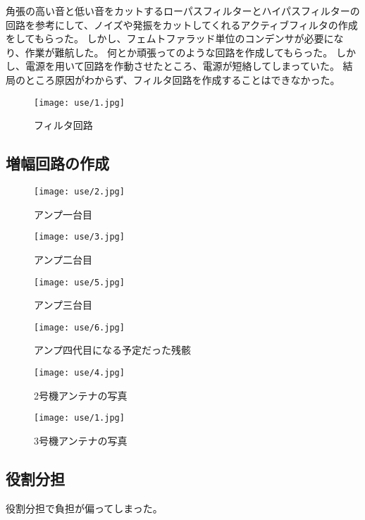 \documentclass[report.tex]{subfiles}
\begin{document}
角張の高い音と低い音をカットするローパスフィルターとハイパスフィルターの回路を参考にして、ノイズや発振をカットしてくれるアクティブフィルタの作成をしてもらった。
しかし、フェムトファラッド単位のコンデンサが必要になり、作業が難航した。
何とか頑張ってのような回路を作成してもらった。
しかし、電源を用いて回路を作動させたところ、電源が短絡してしまっていた。
結局のところ原因がわからず、フィルタ回路を作成することはできなかった。

\begin{figure}[H]
	\centering
	\texttt{[image: use/1.jpg]}
	\caption{フィルタ回路}
	\label{fig:filter}
\end{figure}

\subsection{増幅回路の作成}

\begin{figure}[H]
	\begin{minipage}[b]{0.5\linewidth}
		\centering
		\texttt{[image: use/2.jpg]}
		\caption{アンプ一台目}
		\label{fig:s_2}
	\end{minipage}
	\begin{minipage}[b]{0.5\linewidth}
		\centering
		\texttt{[image: use/3.jpg]}
		\caption{アンプ二台目}
		\label{fig:s_3}
	\end{minipage}
\end{figure}

\begin{figure}[H]
	\begin{minipage}[b]{0.5\linewidth}
		\centering
		\texttt{[image: use/5.jpg]}
		\caption{アンプ三台目}
		\label{fig:s_4}
	\end{minipage}
	\begin{minipage}[b]{0.5\linewidth}
		\centering
		\texttt{[image: use/6.jpg]}
		\caption{アンプ四代目になる予定だった残骸}
		\label{fig:s_5}
	\end{minipage}
\end{figure}

\begin{figure}[H]
	\begin{minipage}[b]{0.5\linewidth}
		\centering
		\texttt{[image: use/4.jpg]}
		\caption{2号機アンテナの写真}
		\label{fig:s_6}
	\end{minipage}
	\begin{minipage}[b]{0.5\linewidth}
		\centering
		\texttt{[image: use/1.jpg]}
		\caption{3号機アンテナの写真}
		\label{fig:s_7}
	\end{minipage}
\end{figure}

\subsection{役割分担}

役割分担で負担が偏ってしまった。
\end{document}
